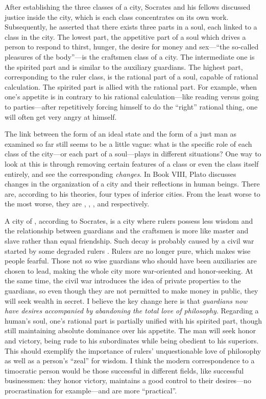 After establishing the three classes of a city, Socrates and his fellows
discussed justice inside the city, which is each class concentrates on its own
work. Subsequently, he asserted that there exists three parts in a
soul, each linked to a class in the city. The lowest part, the
appetitive part of a soul which drives a person to respond to thirst, hunger,
the desire for money and sex—“the so-called pleasures of the body”—is the
craftsmen class of a city. The intermediate one is the spirited part
and is similar to the auxiliary guardians. The highest part,
corresponding to the ruler class, is the rational part of a soul, capable of
rational calculation. The spirited part is allied with the rational
part. For example, when one's appetite is in contrary to his rational
calculation—like reading  versus going to parties—after
repetitively forcing himself to do the “right” rational thing, one will often
get very angry at himself.

The link between the form of an ideal state and the form of a just man as
examined so far still seems to be a little vague: what is the specific role of
each class of the city—or each part of a soul—plays in different situations?
One way to look at this is through removing certain features of a class or even
the class itself entirely, and see the corresponding \emph{changes}. In Book
VIII, Plato discusses changes in the organization of a city and their
reflections in human beings. There are, according to his theories, four types of
inferior cities. From the least worse to the most worse, they are
, , , and
 respectively.

A city of , according to Socrates, is a city where rulers
possess less wisdom and the relationship between guardians and the
craftsmen is more like master and slave rather than equal friendship.
Such decay is probably caused by a civil war started by some degraded rulers
. Rulers are no longer pure, which makes wise people fearful. Those
not so wise guardians who should have been auxiliaries are chosen to lead,
making the whole city more war-oriented and honor-seeking. At the
same time, the civil war introduces the idea of private properties to the
guardians, so even though they are not permitted to make money in public, they
will seek wealth in secret. I believe the key change here is that
\emph{guardians now have desires accompanied by abandoning the total love of
philosophy}. Regarding a human’s soul, one’s rational part is partially unified
with his spirited part, though still maintaining absolute dominance over his
appetite. The man will seek honor and victory, being rude to his subordinates
while being obedient to his superiors. This should exemplify
the importance of rulers’ unquestionable love of philosophy as well as a
person’s “zeal” for wisdom. I think the modern correspondence to a timocratic
person would be those successful in different fields, like successful
businessmen: they honor victory, maintains a good control to their desires—no
procrastination for example—and are more “practical”.

